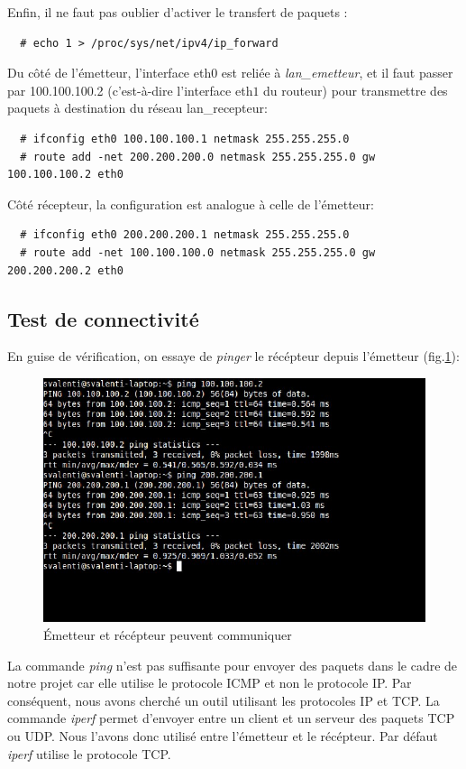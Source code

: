 \documentclass[a4paper]{article}
\begin{document}
Enfin, il ne faut pas oublier d'activer le transfert de
paquets :
\begin{verbatim}
  # echo 1 > /proc/sys/net/ipv4/ip_forward
\end{verbatim}

Du côté de l'émetteur, l'interface eth$0$ est reliée à
\textit{lan\_emetteur}, et il faut passer par 100.100.100.2
(c'est-à-dire l'interface eth$1$ du routeur) pour transmettre
des paquets à destination du réseau lan\_recepteur:
\begin{verbatim}
  # ifconfig eth0 100.100.100.1 netmask 255.255.255.0
  # route add -net 200.200.200.0 netmask 255.255.255.0 gw 100.100.100.2 eth0
\end{verbatim}

Côté récepteur, la configuration est analogue à celle de l'émetteur:
\begin{verbatim}
  # ifconfig eth0 200.200.200.1 netmask 255.255.255.0
  # route add -net 100.100.100.0 netmask 255.255.255.0 gw 200.200.200.2 eth0
\end{verbatim}

\subsection{Test de connectivité}
En guise de vérification, on essaye de \textit{pinger} le
récépteur depuis l'émetteur (fig.\ref{ping1}):

\begin{figure}[!ht]
	\centering
	\includegraphics[scale=.5]{ping.jpg}
	\caption{\label{ping1} Émetteur et récépteur peuvent communiquer}
\end{figure}

La commande \textit{ping} n'est pas suffisante pour envoyer
des paquets dans le cadre de notre projet car elle utilise
le protocole ICMP et non le protocole IP. Par conséquent,
nous avons cherché un outil utilisant les protocoles IP et TCP.
La commande \textit{iperf} permet d'envoyer entre un client et
un serveur des paquets TCP ou UDP. Nous l'avons donc utilisé
entre l'émetteur et le récépteur. Par défaut \textit{iperf}
utilise le protocole TCP.
\end{document}
